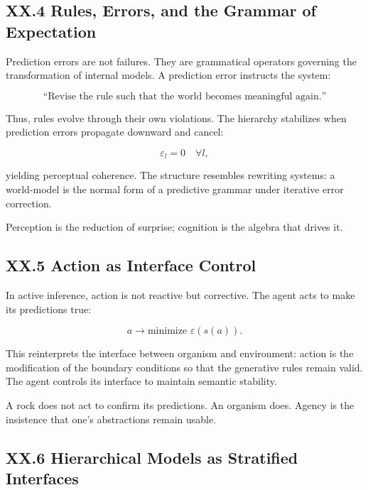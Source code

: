 \documentclass[11pt,letterpaper]{article}
\begin{document}
\subsection{XX.4 Rules, Errors, and the Grammar of Expectation}

Prediction errors are not failures. They are grammatical operators governing the transformation of internal models.  
A prediction error instructs the system:

\[
\text{“Revise the rule such that the world becomes meaningful again.”}
\]

Thus, rules evolve through their own violations.  
The hierarchy stabilizes when prediction errors propagate downward and cancel:

\[
\varepsilon_l = 0 \quad \forall l,
\]

yielding perceptual coherence.  
The structure resembles rewriting systems: a world-model is the normal form of a predictive grammar under iterative error correction.

Perception is the reduction of surprise; cognition is the algebra that drives it.

\subsection{XX.5 Action as Interface Control}

In active inference, action is not reactive but corrective. The agent acts to make its predictions true:

\[
a \to \text{minimize } \varepsilon(s(a)).
\]

This reinterprets the interface between organism and environment:  
action is the modification of the boundary conditions so that the generative rules remain valid.  
The agent controls its interface to maintain semantic stability.

A rock does not act to confirm its predictions.  
An organism does.  
Agency is the insistence that one’s abstractions remain usable.

\subsection{XX.6 Hierarchical Models as Stratified Interfaces}
\end{document}
